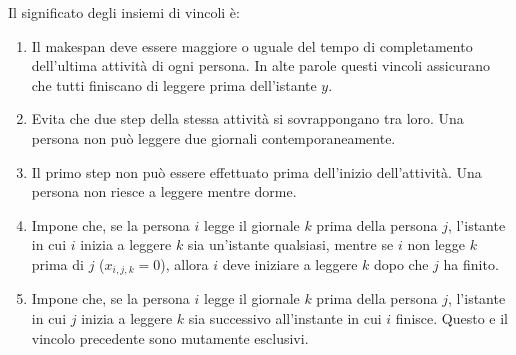 \noindent Il significato degli insiemi di vincoli è:
\begin{enumerate}[(1)]
	\item Il makespan deve essere maggiore o uguale del tempo di completamento dell'ultima attività di ogni persona. In alte parole questi vincoli assicurano che tutti finiscano di leggere prima dell'istante $y$.
	\item Evita che due step della stessa attività si sovrappongano tra loro. Una persona non può leggere due giornali contemporaneamente.
	\item Il primo step non può essere effettuato prima dell'inizio dell'attività. Una persona non riesce a leggere mentre dorme.
	\item Impone che, se la persona $i$ legge il giornale $k$ prima della persona $j$, l'istante in cui $i$ inizia a leggere $k$ sia un'istante qualsiasi, mentre se $i$ non legge $k$ prima di $j$ ($x_{i,j,k}=0$), allora $i$ deve iniziare a leggere $k$ dopo che $j$ ha finito.
	\item Impone che, se la persona $i$ legge il giornale $k$ prima della persona $j$, l'istante in cui $j$ inizia a leggere $k$ sia successivo all'instante in cui $i$ finisce. Questo e il vincolo precedente sono mutamente esclusivi.
\end{enumerate}



